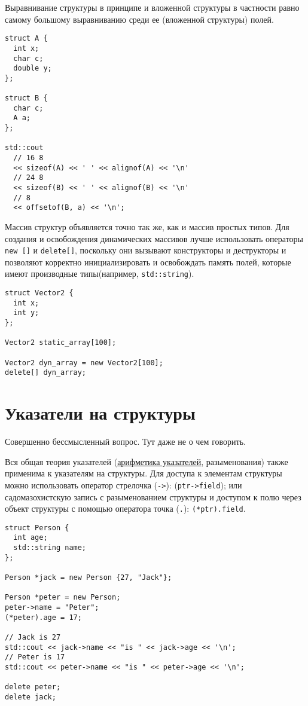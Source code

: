 Выравнивание структуры в принципе и вложенной структуры в частности равно самому
большому выравниванию среди ее (вложенной структуры) полей.
\begin{verbatim}
struct A {
  int x;
  char c;
  double y;
};

struct B {
  char c;
  A a;
};

std::cout
  // 16 8
  << sizeof(A) << ' ' << alignof(A) << '\n'
  // 24 8
  << sizeof(B) << ' ' << alignof(B) << '\n'
  // 8
  << offsetof(B, a) << '\n';
\end{verbatim}

Массив структур объявляется точно так же, как и массив простых типов.
Для создания и освобождения динамических массивов лучше использовать
операторы \verb|new []| и \verb|delete[]|, поскольку они вызывают
конструкторы и деструкторы и позволяют корректно инициализировать и
освобождать память полей, которые имеют производные типы(например,
\verb|std::string|).
\begin{verbatim}
struct Vector2 {
  int x;
  int y;
};

Vector2 static_array[100];

Vector2 dyn_array = new Vector2[100];
delete[] dyn_array;
\end{verbatim}

\section{Указатели на структуры}
Совершенно бессмысленный вопрос. Тут даже не о чем говорить.

Вся общая теория указателей (\hyperref[sec:ptr_arithm]{арифметика указателей}, разыменования) также
применима к указателям на структуры. Для доступа к элементам структуры можно использовать
оператор стрелочка (\verb|->|): (\verb|ptr->field|); или садомазохистскую запись с разыменованием структуры
и доступом к полю через объект структуры с помощью оператора точка (\verb|.|): \verb|(*ptr).field|.
\begin{verbatim}
struct Person {
  int age;
  std::string name;
};

Person *jack = new Person {27, "Jack"};

Person *peter = new Person;
peter->name = "Peter";
(*peter).age = 17;

// Jack is 27
std::cout << jack->name << "is " << jack->age << '\n';
// Peter is 17
std::cout << peter->name << "is " << peter->age << '\n';

delete peter;
delete jack;
\end{verbatim}

